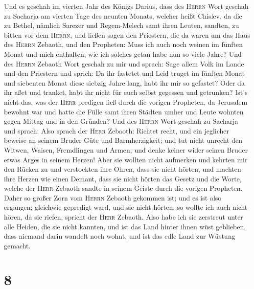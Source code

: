  Und es geschah im vierten Jahr des Königs Darius, dass
des \textsc{Herrn} Wort geschah zu Sacharja am vierten Tage des neunten
Monats, welcher heißt Chislev,  da die zu Bethel, nämlich
Sarezer und Regem-Melech samt ihren Leuten, sandten, zu bitten vor dem
\textsc{Herrn},  und ließen sagen den Priestern, die da
waren um das Haus des \textsc{Herrn} Zebaoth, und den Propheten: Muss
ich auch noch weinen im fünften Monat und mich enthalten, wie ich
solches getan habe nun so viele Jahre?  Und des
\textsc{Herrn} Zebaoth Wort geschah zu mir und sprach: 
Sage allem Volk im Lande und den Priestern und sprich: Da ihr fastetet
und Leid truget im fünften Monat und siebenten Monat diese siebzig Jahre
lang, habt ihr mir so gefastet?  Oder da ihr aßet und
tranket, habt ihr nicht für euch selbst gegessen und getrunken?
 Ist's nicht das, was der \textsc{Herr} predigen ließ
durch die vorigen Propheten, da Jerusalem bewohnt war und hatte die
Fülle samt ihren Städten umher und Leute wohnten gegen Mittag und in den
Gründen?  Und des \textsc{Herrn} Wort geschah zu Sacharja
und sprach:  Also sprach der \textsc{Herr} Zebaoth:
Richtet recht, und ein jeglicher beweise an seinem Bruder Güte und
Barmherzigkeit;  und tut nicht unrecht den Witwen,
Waisen, Fremdlingen und Armen; und denke keiner wider seinen Bruder
etwas Arges in seinem Herzen!  Aber sie wollten nicht
aufmerken und kehrten mir den Rücken zu und verstockten ihre Ohren, dass
sie nicht hörten,  und machten ihre Herzen wie einen
Demant, dass sie nicht hörten das Gesetz und die Worte, welche der
\textsc{Herr} Zebaoth sandte in seinem Geiste durch die vorigen
Propheten. Daher so großer Zorn vom \textsc{Herrn} Zebaoth gekommen ist;
 und es ist also ergangen; gleichwie gepredigt ward, und
sie nicht hörten, so wollte ich auch nicht hören, da sie riefen, spricht
der \textsc{Herr} Zebaoth.  Also habe ich sie zerstreut
unter alle Heiden, die sie nicht kannten, und ist das Land hinter ihnen
wüst geblieben, dass niemand darin wandelt noch wohnt, und ist das edle
Land zur Wüstung gemacht.

\hypertarget{section-7}{%
\section{8}\label{section-7}}

